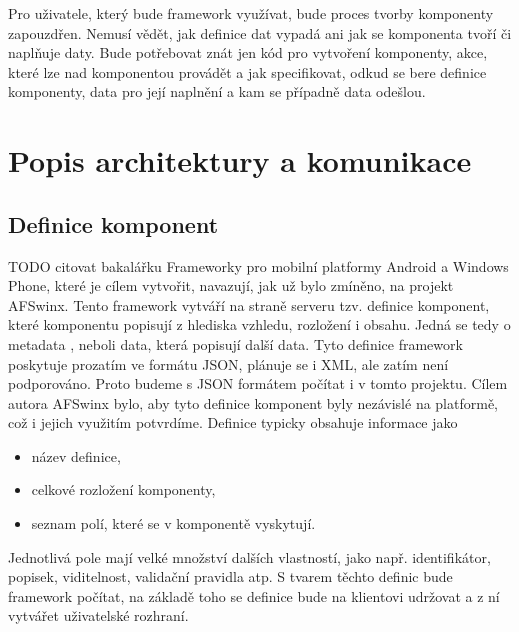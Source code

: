 Pro uživatele, který bude framework využívat, bude proces tvorby komponenty zapouzdřen. Nemusí vědět, jak definice dat vypadá ani jak se komponenta tvoří či naplňuje daty. Bude potřebovat znát jen kód pro vytvoření komponenty, akce, které lze nad komponentou provádět a jak specifikovat, odkud se bere definice komponenty, data pro její naplnění a kam se případně data odešlou.

\section{Popis architektury a komunikace}
\subsection{Definice komponent}
TODO citovat bakalářku
Frameworky pro mobilní platformy Android a Windows Phone, které je cílem vytvořit, navazují, jak už bylo zmíněno, na projekt AFSwinx. Tento framework vytváří na straně serveru tzv. definice komponent, které komponentu popisují z hlediska vzhledu, rozložení i obsahu. Jedná se tedy o metadata \cite{https://en.wikipedia.org/wiki/Metadata}, neboli data, která popisují další data. Tyto definice framework poskytuje prozatím ve formátu JSON, plánuje se i XML, ale zatím není podporováno. Proto budeme s JSON formátem počítat i v tomto projektu. Cílem autora AFSwinx bylo, aby tyto definice komponent byly nezávislé na platformě, což i jejich využitím potvrdíme.
Definice typicky obsahuje informace jako
\begin{itemize}
\item název definice,
\item celkové rozložení komponenty,
\item seznam polí, které se v komponentě vyskytují.
\end{itemize}
Jednotlivá pole mají velké množství dalších vlastností, jako např. identifikátor, popisek, viditelnost, validační pravidla atp. S tvarem těchto definic bude framework počítat, na základě toho se definice bude na klientovi udržovat a z ní vytvářet uživatelské rozhraní. 

